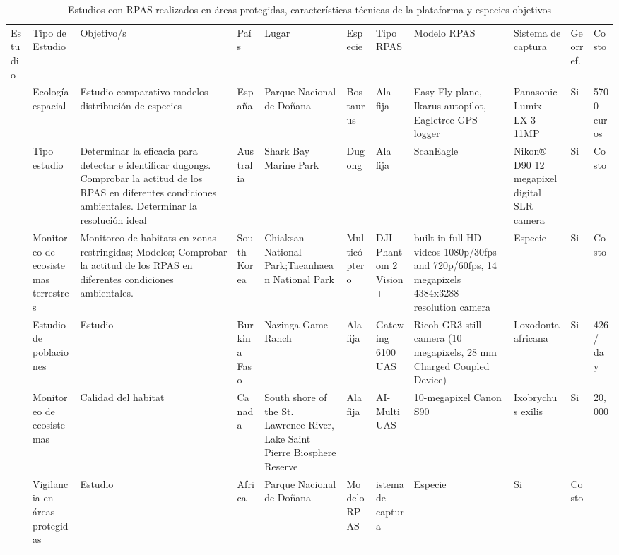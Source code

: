 \documentclass[11pt,]{article}
\begin{document}
\begin{sidewaystable}
\centering
\captionsetup{font=scriptsize,labelfont=scriptsize}
\caption{Estudios con RPAS realizados en áreas protegidas, características técnicas de la plataforma y especies objetivos}
\label{my-label}
\tiny
\begin{tabular}{p{2.5cm}p{1cm}p{3cm}p{1cm}p{2cm}p{2cm}p{1cm}p{2cm}p{2cm}p{1cm}p{0.5cm}}
\cmidrule(r){1-11}

Estudio & Tipo de Estudio & Objetivo/s & País & Lugar & Especie & Tipo RPAS & Modelo RPAS & Sistema de captura & Georref. & Costo \\ \cmidrule(r){1-11}

\cite{PazmanyMulero2015}  & Ecología espacial & Estudio comparativo modelos distribución de especies & España & Parque Nacional de Doñana & Bos taurus  & Ala fija & Easy Fly plane, Ikarus autopilot, Eagletree GPS logger & Panasonic Lumix LX-3 11MP & Si & 5700 euros \\ 

\citealt{Hodgson2013} & Tipo estudio & Determinar la eficacia para detectar e identificar dugongs.  Comprobar la actitud de los RPAS en diferentes condiciones ambientales. Determinar la resolución ideal  & Australia & Shark Bay Marine Park & Dugong & Ala fija &  ScanEagle & Nikon® D90 12 megapixel digital SLR camera  & Si & Costo  \\ 

\cite{Ivosevic2015}  & Monitoreo de ecosistemas terrestres & Monitoreo de habitats en zonas restringidas; Modelos; Comprobar la actitud de los RPAS en diferentes condiciones ambientales. & South Korea & Chiaksan National Park;Taeanhaean National Park & Multicóptero & DJI Phantom 2 Vision+ & built-in full HD videos  1080p/30fps and 720p/60fps, 14 megapixels 4384x3288 resolution camera & Especie & Si & Costo \\ 

\cite{Vermeulen2013}  & Estudio de poblaciones & Estudio &  Burkina Faso & Nazinga Game Ranch & Ala fija  &  Gatewing 6100 UAS & Ricoh GR3 still camera (10 megapixels, 28 mm Charged Coupled Device) & Loxodonta africana & Si & 426 / day \\ 


\cite{Chabot2014}  & Monitoreo de ecosistemas & Calidad del habitat & Canada & South shore of the St. Lawrence River, Lake Saint Pierre Biosphere Reserve  & Ala fija  &  AI-Multi UAS & 10-megapixel Canon S90 & Ixobrychus exilis & Si & 20,000  \\ 
\cite{Mulero-Pazmany2014}  & Vigilancia en áreas protegidas & Estudio & Africa & Parque Nacional de Doñana & Modelo RPAS  & istema de captura & Especie & Si & Costo  \\ 


\end{tabular}
\end{sidewaystable}
\end{document}

